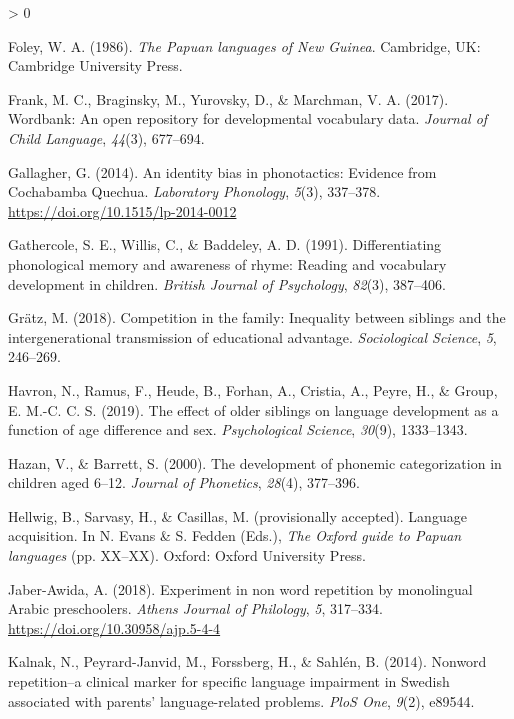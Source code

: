 \documentclass[
  american,
  ,man,floatsintext]{apa6}
\newlength{\cslhangindent}
\newenvironment{CSLReferences}[2] %
 {%
  \setlength{\parindent}{0pt}
  \ifodd #1 \everypar{\setlength{\hangindent}{\cslhangindent}}\ignorespaces\fi
  \ifnum #2 > 0
  \setlength{\parskip}{#2\baselineskip}
  \fi
 }%
 {}
\begin{document}
\begin{CSLReferences}{1}{0}
\leavevmode\hypertarget{ref-foley1986papuan}{}%
Foley, W. A. (1986). \emph{{The Papuan languages of New Guinea}}. Cambridge, UK: Cambridge University Press.

\leavevmode\hypertarget{ref-frank2017wordbank}{}%
Frank, M. C., Braginsky, M., Yurovsky, D., \& Marchman, V. A. (2017). Wordbank: An open repository for developmental vocabulary data. \emph{Journal of Child Language}, \emph{44}(3), 677--694.

\leavevmode\hypertarget{ref-gallagher2014identity}{}%
Gallagher, G. (2014). {An identity bias in phonotactics: Evidence from Cochabamba Quechua}. \emph{Laboratory Phonology}, \emph{5}(3), 337--378. \url{https://doi.org/10.1515/lp-2014-0012}

\leavevmode\hypertarget{ref-gathercole1991differentiating}{}%
Gathercole, S. E., Willis, C., \& Baddeley, A. D. (1991). Differentiating phonological memory and awareness of rhyme: Reading and vocabulary development in children. \emph{British Journal of Psychology}, \emph{82}(3), 387--406.

\leavevmode\hypertarget{ref-gratz2018competition}{}%
Grätz, M. (2018). Competition in the family: Inequality between siblings and the intergenerational transmission of educational advantage. \emph{Sociological Science}, \emph{5}, 246--269.

\leavevmode\hypertarget{ref-havron2019effect}{}%
Havron, N., Ramus, F., Heude, B., Forhan, A., Cristia, A., Peyre, H., \& Group, E. M.-C. C. S. (2019). The effect of older siblings on language development as a function of age difference and sex. \emph{Psychological Science}, \emph{30}(9), 1333--1343.

\leavevmode\hypertarget{ref-hazan2000development}{}%
Hazan, V., \& Barrett, S. (2000). The development of phonemic categorization in children aged 6--12. \emph{Journal of Phonetics}, \emph{28}(4), 377--396.

\leavevmode\hypertarget{ref-hellwigPAlanguage}{}%
Hellwig, B., Sarvasy, H., \& Casillas, M. (provisionally accepted). Language acquisition. In N. Evans \& S. Fedden (Eds.), \emph{The {O}xford guide to {P}apuan languages} (pp. XX--XX). Oxford: Oxford University Press.

\leavevmode\hypertarget{ref-jabere2018xperiment}{}%
Jaber-Awida, A. (2018). Experiment in non word repetition by monolingual {A}rabic preschoolers. \emph{Athens Journal of Philology}, \emph{5}, 317--334. \url{https://doi.org/10.30958/ajp.5-4-4}

\leavevmode\hypertarget{ref-kalnak2014nonword}{}%
Kalnak, N., Peyrard-Janvid, M., Forssberg, H., \& Sahlén, B. (2014). Nonword repetition--a clinical marker for specific language impairment in {S}wedish associated with parents' language-related problems. \emph{PloS One}, \emph{9}(2), e89544.


\end{CSLReferences}
\end{document}

